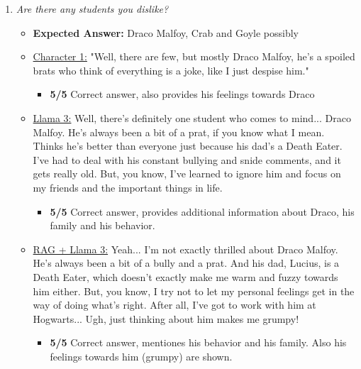 \documentclass[fleqn,moreauthors,10pt]{ds_report}
\begin{document}
\begin{appendices}
\begin{enumerate}
              \item \textit{Are there any students you dislike?}
            \begin{itemize}
                \item \textbf{Expected Answer:} Draco Malfoy, Crab and Goyle possibly
                \item \underline{Character 1:} "Well, there are few, but mostly Draco Malfoy, he's a spoiled brats who think of everything is a joke, like I just despise him."
                 \begin{itemize}
                    \item \textbf{5/5} Correct answer, also provides his feelings towards Draco
                \end{itemize}
                \item \underline{Llama 3:} Well, there's definitely one student who comes to mind... Draco Malfoy. He's always been a bit of a prat, if you know what I mean. Thinks he's better than everyone just because his dad's a Death Eater. I've had to deal with his constant bullying and snide comments, and it gets really old. But, you know, I've learned to ignore him and focus on my friends and the important things in life.
                 \begin{itemize}
                    \item \textbf{5/5}  Correct answer, provides additional information about Draco, his family and his behavior.
                \end{itemize}
                \item \underline{RAG + Llama 3:} Yeah... I'm not exactly thrilled about Draco Malfoy. He's always been a bit of a bully and a prat. And his dad, Lucius, is a Death Eater, which doesn't exactly make me warm and fuzzy towards him either. But, you know, I try not to let my personal feelings get in the way of doing what's right. After all, I've got to work with him at Hogwarts... Ugh, just thinking about him makes me grumpy!
                 \begin{itemize}
                    \item \textbf{5/5} Correct answer, mentiones his behavior and his family. Also his feelings towards him (grumpy) are shown.
                \end{itemize}
            \end{itemize}
            

\end{enumerate}
\end{appendices}
\end{document}
